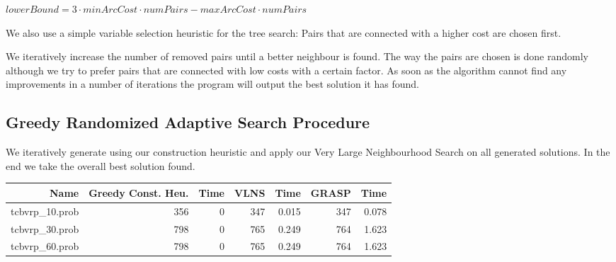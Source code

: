 \documentclass[a4paper]{scrartcl}
\begin{document}
$lowerBound = 3 \cdot minArcCost \cdot numPairs - maxArcCost \cdot numPairs $



We also use a simple variable selection heuristic for the tree search: Pairs that are connected with a higher cost are chosen first.

We iteratively increase the number of removed pairs until a better neighbour is found. The way the pairs are chosen is done randomly although we try to prefer pairs that are connected with low costs with a certain factor. As soon as the algorithm cannot find any improvements in a number of iterations the program will output the best solution it has found.

\subsection{Greedy Randomized Adaptive Search Procedure}
We iteratively generate using our construction heuristic and apply our Very Large Neighbourhood Search on all generated solutions. In the end we take the overall best solution found.



\begin{tabular}{r | r | r | r | r | r | r}
\hline
Name & Greedy Const. Heu. & Time & VLNS & Time & GRASP & Time \\
\hline \hline 
tcbvrp\_10.prob & 356 & 0 & 347 & 0.015 & 347 & 0.078 \\
\hline
tcbvrp\_30.prob & 798 & 0 & 765 & 0.249 & 764 & 1.623 \\
\hline
tcbvrp\_60.prob & 798 & 0 & 765 & 0.249 & 764 & 1.623 \\

\end{tabular}





\end{document}
